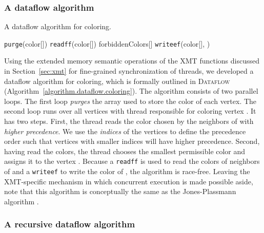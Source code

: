 \documentclass{article}
\begin{document}
\subsubsection{A dataflow algorithm}

\begin{algorithm}[t]
\small
\caption{A dataflow algorithm for coloring.} 
\label{algorithm.dataflow.coloring}
\begin{algorithmic}[1]
   \label{l:purge}
      \State \texttt{purge}(\textsf{color}[]) 
  \EndFor
   \label{l:dcolor}
              \State   \texttt{readff}(\textsf{color}[])       
               \label{dataflow:readff-line}
             \State \textsf{forbiddenColors}[]   
      \EndFor
      \State      
      \State \texttt{writeef}(\textsf{color}[], ) 
  \EndFor
\EndProcedure
\end{algorithmic}
\end{algorithm}

Using the extended memory semantic operations of the XMT functions discussed in 
Section~\ref{sec:xmt} for fine-grained synchronization of threads, 
we developed a dataflow algorithm for coloring, which is formally 
outlined in \textsc{Dataflow} (Algorithm~\ref{algorithm.dataflow.coloring}).
The algorithm consists of two parallel loops.
The first loop {\em purges} the array used to store the color of each vertex.
The second loop runs over all vertices with thread  responsible for coloring vertex .
It has two steps.
First, the thread  reads the color chosen by the neighbors of  with {\em higher precedence}.
We use the {\em indices} of the vertices to define the precedence
order such that vertices with smaller indices will have higher precedence.
Second, having read the colors, the thread  chooses the smallest permissible color and 
assigns it to the vertex .
Because a \texttt{readff} is used to read the colors of neighbors of  and 
a \texttt{writeef} to write the color of , the algorithm is race-free.
Leaving the XMT-specific mechanism in which concurrent execution
is made possible aside, note that this algorithm is conceptually the same as the 
Jones-Plassmann algorithm \cite{JP93-v2}.

\subsubsection{A recursive dataflow algorithm}
\end{document}

